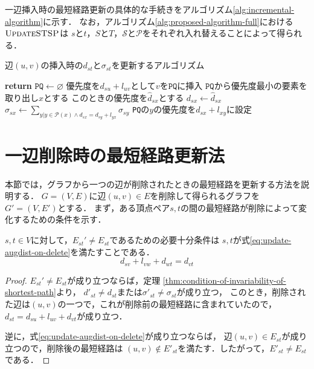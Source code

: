 一辺挿入時の最短経路更新の具体的な手続きをアルゴリズム\ref{alg:incremental-algorithm}に示す．
なお，アルゴリズム\ref{alg:proposed-algorithm-full}における$\textproc{UpdateSTSP}$は
$s$と$t$，$S$と$T$，$\mathcal{S}$と$\mathcal{P}$をそれぞれ入れ替えることによって得られる．

\begin{algorithm}[tb]
  \caption{辺$(u,v)$の挿入時の$d_{st}$と$\sigma_{st}$を更新するアルゴリズム}
  \label{alg:incremental-algorithm}
  \begin{algorithmic}[1]\small
    \State \textbf{return}
    \EndIf
    \State $\texttt{PQ}\gets\varnothing$
    \State 優先度を$d_{su}+l_{uv}$として$v$を$\texttt{PQ}$に挿入
    \State $\texttt{PQ}$から優先度最小の要素を取り出し$x$とする
    \State このときの優先度を$\hat{d}_{sx}$とする
    \State $d_{sx}\gets\hat{d}_{sx}$
    \State $\sigma_{sx}\gets\sum_{y|y\in\mathcal{P}(x)\land d_{sx}=d_{sy}+l_{yx}}\sigma_{sy}$
    \State \texttt{PQ}の$y$の優先度を$d_{sx}+l_{xy}$に設定
    \EndIf
    \EndFor
    \EndWhile
    \EndProcedure
  \end{algorithmic}
\end{algorithm}

\section{一辺削除時の最短経路更新法}
\label{sect:update-apsp-on-delete}
本節では，グラフから一つの辺が削除されたときの最短経路を更新する方法を説明する．
$G=(V,E)$に辺$(u,v)\in E$を削除して得られるグラフを$G'=(V,E')$とする．
まず，ある頂点ペア$s,t$の間の最短経路が削除によって変化するための条件を示す．

\begin{lemma}
  \label{lmm:update-augdist-on-delete}
  $s,t\in V$に対して，$E_{st}'\neq E_{st}$であるための必要十分条件は
  $s,t$が式\eqref{eq:update-augdist-on-delete}を満たすことである．
  \begin{equation}
    d_{sv}+l_{vw}+d_{wt}=d_{vt}
    \label{eq:update-augdist-on-delete}
  \end{equation}
\end{lemma}
\begin{proof}
  $E_{st}'\neq E_{st}$が成り立つならば，定理
  \ref{thm:condition-of-invariability-of-shortest-path}より，
  $d'_{st}\neq d_{st}$または$\sigma'_{st}\neq\sigma_{st}$が成り立つ，
  このとき，削除された辺は$(u,v)$の一つで，これが削除前の最短経路に含まれていたので，
  $d_{st}=d_{su}+l_{uv}+d_{vt}$が成り立つ．

  逆に，式\eqref{eq:update-augdist-on-delete}が成り立つならば，
  辺$(u,v)\in E_{st}$が成り立つので，削除後の最短経路は
  $(u,v)\notin E'_{st}$を満たす．したがって，$E'_{st}\neq E_{st}$である．
\end{proof}

